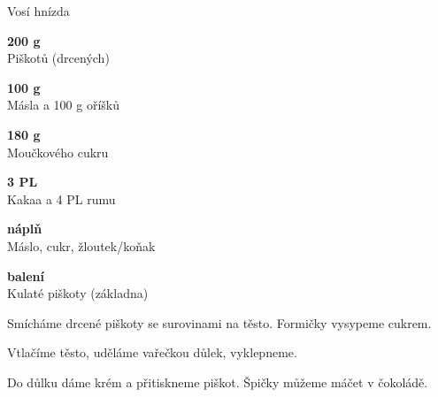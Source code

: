 \documentclass[11pt,a4paper]{article}
\begin{document}
\begin{recipe}[Maroon]{Vosí hnízda}
    \begin{ingredients}
        \item \parbox[t]{\linewidth}{\raggedright \weight \textbf{200 g}\\ Piškotů (drcených)}
        \item \parbox[t]{\linewidth}{\raggedright \weight \textbf{100 g}\\ Másla a 100 g oříšků}
        \item \parbox[t]{\linewidth}{\raggedright \weight \textbf{180 g}\\ Moučkového cukru}
        \item \parbox[t]{\linewidth}{\raggedright \spoon \textbf{3 PL}\\ Kakaa a 4 PL rumu}
        \item \parbox[t]{\linewidth}{\raggedright \indefinite \textbf{náplň}\\ Máslo, cukr, žloutek/koňak}
        \item \parbox[t]{\linewidth}{\raggedright \piece \textbf{balení}\\ Kulaté piškoty (základna)}
    \end{ingredients}
    \begin{steps}
        \item Smícháme drcené piškoty se surovinami na těsto. Formičky vysypeme cukrem.
        \item Vtlačíme těsto, uděláme vařečkou důlek, vyklepneme.
        \item Do důlku dáme krém a přitiskneme piškot. Špičky můžeme máčet v čokoládě.
    \end{steps}
\end{recipe}
\end{document}
